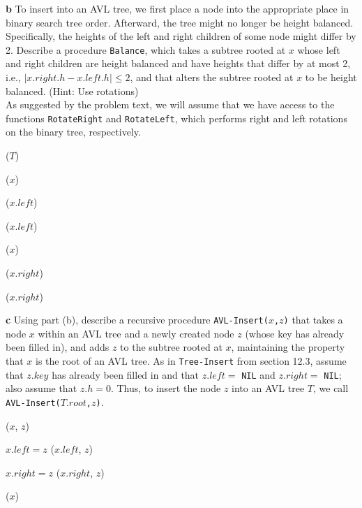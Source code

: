 \documentclass[11pt,english]{article}
\begin{document}
\newpage
\noindent \large{\textbf{b} \mdseries To insert into an AVL tree, we first
place a node into the appropriate place in binary search tree order.
Afterward, the tree might no longer be height balanced. Specifically, the
heights of the left and right children of some node might differ by 2.
Describe a procedure \texttt{Balance}, which takes a subtree rooted at $x$
whose left and right children are height balanced and have heights that differ
by at most 2, i.e., $|x.right.h - x.left.h| \leq 2$, and that alters the
subtree rooted at $x$ to be height balanced. (Hint: Use rotations)}
\\
As suggested by the problem text, we will assume that we have access to the
functions \texttt{RotateRight} and \texttt{RotateLeft}, which performs right
and left rotations on the binary tree, respectively.
\begin{algorithm}
	\BlankLine
	
	\Balance($T$) \\
	\Begin
	{
		{
			\RotateLeft($x$)
			
			{
				\RotateRight($x.left$)
			}
		
			\Balance($x.left$)
		}
		
		{
			\RotateRight($x$)
			
			{
				\RotateLeft($x.right$)
			}
			
			\Balance($x.right$)
		}
	}
\end{algorithm}

\newpage
\noindent \large{\textbf{c} \mdseries Using part (b), describe a recursive
procedure \texttt{AVL-Insert($x$,$z$)} that takes a node $x$ within an AVL
tree and a newly created node $z$ (whose key has already been filled in), and
adds $z$ to the subtree rooted at $x$, maintaining the property that $x$ is
the root of an AVL tree. As in \texttt{Tree-Insert} from section 12.3, assume
that $z.key$ has already been filled in and that $z.left =$ \texttt{NIL} and
$z.right =$ \texttt{NIL}; also assume that $z.h = 0$. Thus, to insert the node
$z$ into an AVL tree $T$, we call \texttt{AVL-Insert($T.root$,$z$)}.}
\begin{algorithm}
	\BlankLine
	
	\AVLInsert($x$, $z$) \\
	\Begin
	{
		{
			{
				$x.left = z$
			}
			{
				\AVLInsert($x.left$, $z$)
			}
		}
		
		{
			{
				$x.right = z$
			}
			{
				\AVLInsert($x.right$, $z$)
			}
		}
		
		\Balance($x$)
	}
\end{algorithm}
\end{document}
